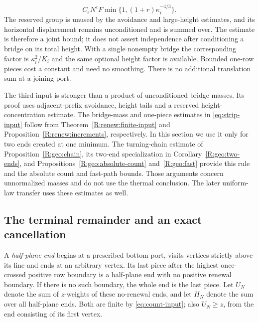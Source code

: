 \begin{enumerate}
\begin{equation}\label{eq:two-node-input}
 C_\varepsilon N^\varepsilon F
       \min\{1,(1+r)\kappa_i^{-4/3}\}.
\end{equation}
The reserved group is unused by the avoidance and large-height estimates, and its horizontal displacement remains unconditioned and is summed over. The estimate is therefore a joint bound; it does not assert independence after conditioning a bridge on its total height. With a single nonempty bridge the corresponding factor is $\kappa_i^2/K_i$ and the same optional height factor is available. Bounded one-row pieces cost a constant and need no smoothing. There is no additional translation sum at a joining port.
\end{enumerate}
The third input is stronger than a product of unconditioned bridge masses. Its proof uses adjacent-prefix avoidance, height tails and a reserved height-concentration estimate. The bridge-mass and one-piece estimates in \eqref{eq:strip-input} follow from Theorem~\ref{R:renew:finite-input} and Proposition~\ref{R:renew:increments}, respectively. In this section we use it only for two ends created at one minimum. The turning-chain estimate of Proposition~\ref{R:geo:chain}, its two-end specialization in Corollary~\ref{R:geo:two-ends}, and Propositions~\ref{R:geo:absolute-count} and~\ref{R:geo:fast} provide this rule and the absolute count and fast-path bounds. Those arguments concern unnormalized masses and do not use the thermal conclusion. The later uniform-law transfer uses these estimates as well.

\subsection{The terminal remainder and an exact cancellation}
A \emph{half-plane end} begins at a prescribed bottom port, visits vertices strictly above its line and ends at an arbitrary vertex. Its last piece after the highest once-crossed positive row boundary is a half-plane end with no positive renewal boundary. If there is no such boundary, the whole end is the last piece. Let $U_N$ denote the sum of $z$-weights of these no-renewal ends, and let $H_N$ denote the sum over all half-plane ends. Both are finite by \eqref{eq:count-input}; also $U_N\ge z$, from the end consisting of its first vertex.

